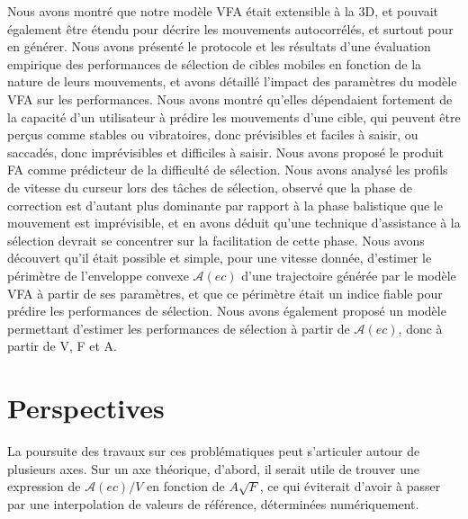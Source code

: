 	Nous avons montré que notre modèle VFA était extensible à la 3D, et pouvait également être étendu pour décrire les mouvements autocorrélés, et surtout pour en générer. Nous avons présenté le protocole et les résultats d'une évaluation empirique des performances de sélection de cibles mobiles en fonction de la nature de leurs mouvements, et avons détaillé l'impact des paramètres du modèle VFA sur les performances. Nous avons montré qu'elles dépendaient fortement de la capacité d'un utilisateur à prédire les mouvements d'une cible, qui peuvent être perçus comme stables ou vibratoires, donc prévisibles et faciles à saisir, ou saccadés, donc imprévisibles et difficiles à saisir. Nous avons proposé le produit FA comme prédicteur de la difficulté de sélection. Nous avons analysé les profils de vitesse du curseur lors des tâches de sélection, observé que la phase de correction est d'autant plus dominante par rapport à la phase balistique que le mouvement est imprévisible, et en avons déduit qu'une technique d'assistance à la sélection devrait se concentrer sur la facilitation de cette phase. Nous avons découvert qu'il était possible et simple, pour une vitesse donnée, d'estimer le périmètre de l'enveloppe convexe $\mathcal{A}(ec)$ d'une trajectoire générée par le modèle VFA à partir de ses paramètres, et que ce périmètre était un indice fiable pour prédire les performances de sélection. Nous avons également proposé un modèle permettant d'estimer les performances de sélection à partir de $\mathcal{A}(ec)$, donc à partir de V, F et A.
	
	
	
	\section*{Perspectives}
	La poursuite des travaux sur ces problématiques peut s'articuler autour de plusieurs axes. Sur un axe théorique, d'abord, il serait utile de trouver une expression de $\mathcal{A}(ec)/V$ en fonction de $A\sqrt{F}$, ce qui éviterait d'avoir à passer par une interpolation de valeurs de référence, déterminées numériquement.
	
